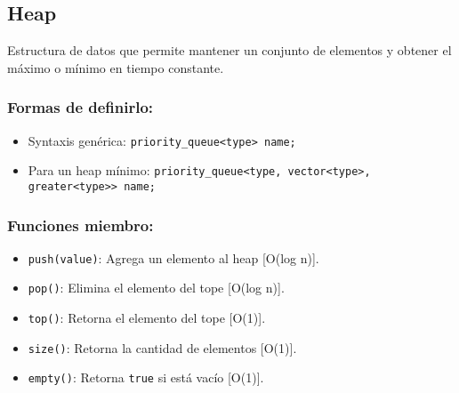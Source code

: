 \subsection{Heap}
\label{subsec:heap}
Estructura de datos que permite mantener un conjunto de elementos y obtener el máximo o mínimo en tiempo constante. 

\subsubsection{Formas de definirlo:}
\begin{itemize}
  \item Syntaxis genérica: \texttt{priority\_queue<type> name;}
  \item Para un heap mínimo: \texttt{priority\_queue<type, vector<type>, greater<type>> name;}
\end{itemize}

\subsubsection{Funciones miembro:}
\begin{itemize}
  \item \texttt{push(value)}: Agrega un elemento al heap [O(log n)].
  \item \texttt{pop()}: Elimina el elemento del tope [O(log n)].
  \item \texttt{top()}: Retorna el elemento del tope [O(1)].
  \item \texttt{size()}: Retorna la cantidad de elementos [O(1)].
  \item \texttt{empty()}: Retorna \texttt{true} si está vacío [O(1)]. 
\end{itemize}
